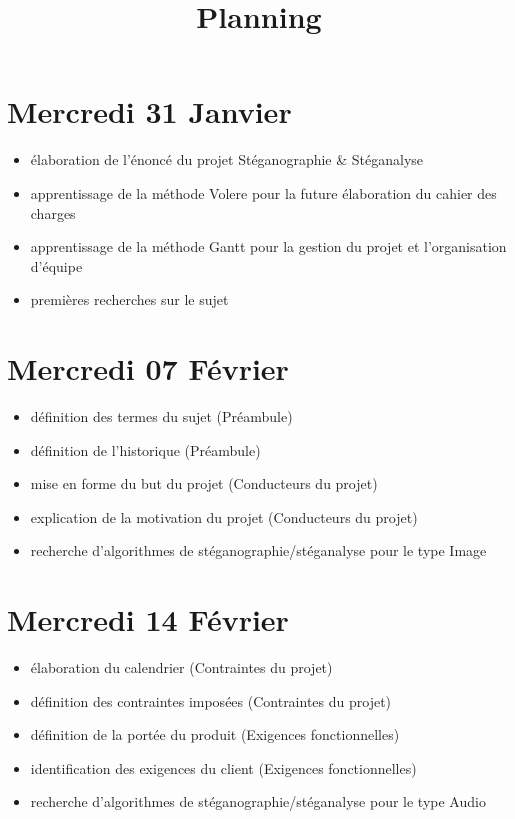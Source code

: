 \documentclass[11pt]{article}
\title{Planning}
\begin{document}
\maketitle

\section{Mercredi 31 Janvier}
\begin {itemize}
\item élaboration de l'énoncé du projet Stéganographie \& Stéganalyse
\item apprentissage de la méthode Volere pour la future élaboration du cahier des charges
\item apprentissage de la méthode Gantt pour la gestion du projet et l'organisation d'équipe
\item premières recherches sur le sujet 
\end{itemize}

\section{Mercredi 07 Février}
\begin {itemize}
\item définition des termes du sujet (Préambule)
\item définition de l'historique (Préambule)
\item mise en forme du but du projet (Conducteurs du projet)
\item explication de la motivation du projet (Conducteurs du projet)
\item recherche d'algorithmes de stéganographie/stéganalyse pour le type Image 
\end{itemize}

\section{Mercredi 14 Février}
\begin {itemize}
\item élaboration du calendrier (Contraintes du projet)
\item définition des contraintes imposées (Contraintes du projet)
\item définition de la portée du produit (Exigences fonctionnelles)
\item identification des exigences du client (Exigences fonctionnelles)
\item recherche d'algorithmes de stéganographie/stéganalyse pour le type Audio
\end{itemize}
\end{document}
